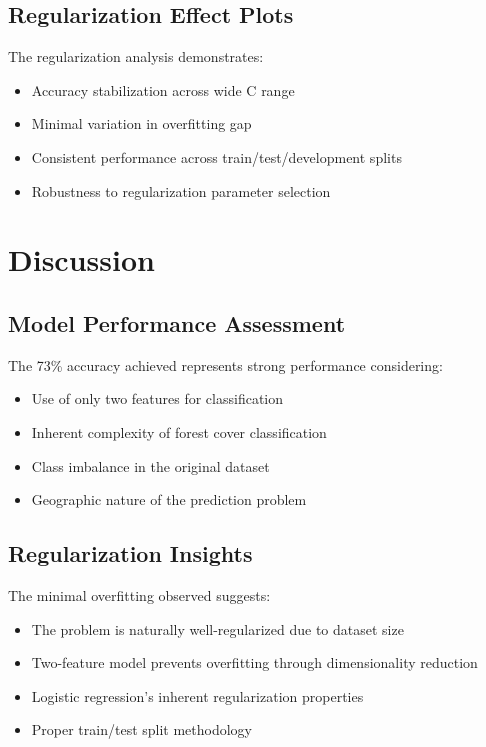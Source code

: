 \documentclass[12pt,a4paper]{article}
\begin{document}
\subsection{Regularization Effect Plots}
The regularization analysis demonstrates:
\begin{itemize}
    \item Accuracy stabilization across wide C range
    \item Minimal variation in overfitting gap
    \item Consistent performance across train/test/development splits
    \item Robustness to regularization parameter selection
\end{itemize}

\section{Discussion}

\subsection{Model Performance Assessment}
The 73\% accuracy achieved represents strong performance considering:
\begin{itemize}
    \item Use of only two features for classification
    \item Inherent complexity of forest cover classification
    \item Class imbalance in the original dataset
    \item Geographic nature of the prediction problem
\end{itemize}

\subsection{Regularization Insights}
The minimal overfitting observed suggests:
\begin{itemize}
    \item The problem is naturally well-regularized due to dataset size
    \item Two-feature model prevents overfitting through dimensionality reduction
    \item Logistic regression's inherent regularization properties
    \item Proper train/test split methodology
\end{itemize}
\end{document}
